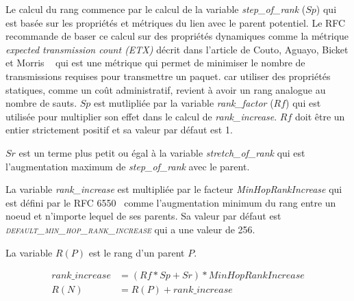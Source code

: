         Le calcul du rang commence par le calcul de la variable \textit{step\_of\_rank} ($Sp$) qui est 
        basée sur  les propriétés et métriques du lien avec le parent potentiel. Le RFC 
        recommande de baser ce calcul sur des propriétés dynamiques comme la métrique \textit{expected transmission count (ETX)} décrit dans l'article de Couto, Aguayo, Bicket et Morris
        ~\cite{paper:etx} qui est une métrique qui permet de minimiser le nombre de transmissions requises pour transmettre un paquet.
        car utiliser des propriétés statiques, comme un coût administratif, revient à avoir un
        rang analogue au nombre de sauts. $Sp$ est mutlipliée par la variable \textit{rank\_factor} ($Rf$) qui est utilisée pour multiplier son effet dans le calcul de
        \textit{rank\_increase}. $Rf$ doit être un entier strictement positif et sa valeur par défaut est 1.

        $Sr$ est un terme plus petit ou égal à la variable \textit{stretch\_of\_rank} qui est l'augmentation maximum de \textit{step\_of\_rank} avec le parent.


        La variable \textit{rank\_increase} est multipliée par le facteur \textit{MinHopRankIncrease} qui est défini par le RFC 6550~\cite{rfc:rpl} comme l'augmentation minimum du rang entre un noeud et n'importe lequel de ses parents. Sa valeur par défaut est \textsl{\textsc{default\_min\_hop\_rank\_increase}} qui a une valeur de 256.
        
        La variable $R(P)$ est le rang d'un parent $P$.

        \begin{equation}\label{eq:state-rankOF0}
            \begin{aligned}
                rank\_increase &= (Rf * Sp + Sr) * MinHopRankIncrease\\
                R(N) &= R(P) + rank\_increase    
            \end{aligned}
        \end{equation} 
                

